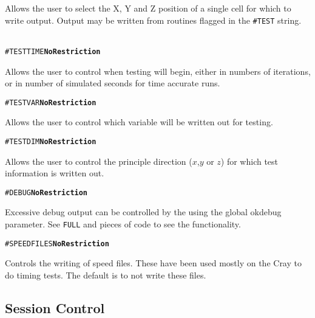 Allows the user to select the X, Y and Z position
of a single cell for which to write output.  Output may be written from
routines flagged in the {\tt \#TEST} string.
\ \ \\

\begin{alltt}
#TESTTIME  \hfill {\bf No Restriction}
\end{alltt}

Allows the user to control when testing will begin, either in numbers
of iterations, or in number of simulated seconds for time accurate runs.
\ \ \\

\begin{alltt}
#TESTVAR  \hfill {\bf No Restriction}
\end{alltt}

Allows the user to control which variable will be written out for testing.
\ \ \\

\begin{alltt}
#TESTDIM  \hfill {\bf No Restriction}
\end{alltt}

Allows the user to control the principle direction ($x$,$y$ or $z$) for
which test information is written out.
\ \ \\

\begin{alltt}
#DEBUG \hfill {\bf No Restriction}
\end{alltt}

Excessive debug output can be controlled by the using the global okdebug 
parameter.  See {\tt FULL} and pieces of code to see the functionality.
\ \ \\

\begin{alltt}
#SPEEDFILES \hfill {\bf No Restriction}
\end{alltt}

Controls the writing of speed files.  These have been used mostly on the
Cray to do timing tests.  The default is to not write these files.
\ \ \\



\subsection{Session Control \label{session_control}} 

